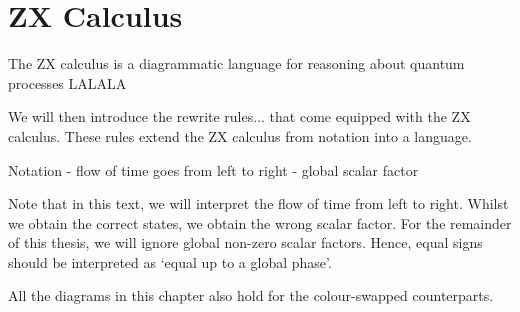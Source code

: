 \chapter{\label{zx-calculus}ZX Calculus}

The ZX calculus is a diagrammatic language for reasoning about quantum processes LALALA

We will then introduce the rewrite rules... that come equipped with the ZX calculus. These rules extend the ZX calculus from notation into a language.

Notation
- flow of time goes from left to right
- global scalar factor


Note that in this text, we will interpret the flow of time from left to right.
Whilst we obtain the correct states, we obtain the wrong scalar factor. For the remainder of this thesis, we will ignore global non-zero scalar factors. Hence, equal signs should be interpreted as `equal up to a global phase'.

All the diagrams in this chapter also hold for the colour-swapped counterparts.

